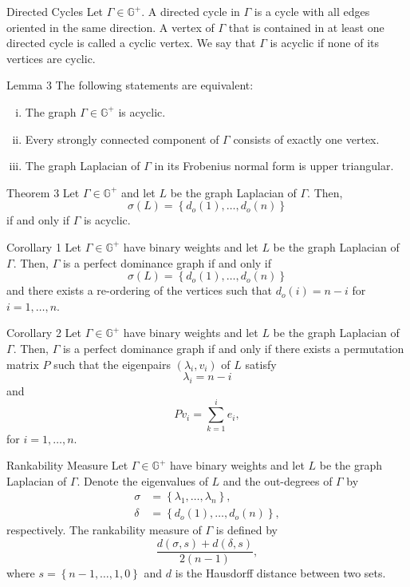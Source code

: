 \documentclass{beamer}
\begin{document}
\begin{frame}{Directed Cycles}
Let $\Gamma\in\mathbb{G}^{+}$. 
A directed cycle in $\Gamma$ is a cycle with all edges oriented in the same direction.
\vfill
A vertex of $\Gamma$ that is contained in at least one directed cycle is called a cyclic vertex.
\vfill
We say that $\Gamma$ is acyclic if none of its vertices are cyclic.
\end{frame}

\begin{frame}{Lemma 3}
The following statements are equivalent:
\vfill
\begin{enumerate}[i.]
\item	The graph $\Gamma\in\mathbb{G}^{+}$ is acyclic.
\vfill
\item	Every strongly connected component of $\Gamma$ consists of exactly one vertex.
\vfill
\item	The graph Laplacian of $\Gamma$ in its Frobenius normal form is upper triangular. 
\end{enumerate}
\end{frame}

\begin{frame}{Theorem 3}
Let $\Gamma\in\mathbb{G}^{+}$ and let $L$ be the graph Laplacian of $\Gamma$.
Then,
\[
\sigma(L)=\left\{d_{o}(1),\ldots,d_{o}(n)\right\}
\]
if and only if $\Gamma$ is acyclic. 
\end{frame}

\begin{frame}{Corollary 1}
Let $\Gamma\in\mathbb{G}^{+}$ have binary weights and let $L$ be the graph Laplacian of $\Gamma$.
\vfill
Then, $\Gamma$ is a perfect dominance graph if and only if
\[
\sigma(L)=\left\{d_{o}(1),\ldots,d_{o}(n)\right\}
\]
and there exists a re-ordering of the vertices such that $d_{o}(i)=n-i$ for $i=1,\ldots,n$.
\end{frame}

\begin{frame}{Corollary 2}
Let $\Gamma\in\mathbb{G}^{+}$ have binary weights and let $L$ be the graph Laplacian of $\Gamma$.
\vfill
Then, $\Gamma$ is a perfect dominance graph if and only if there exists a permutation matrix $P$ such that the eigenpairs $(\lambda_{i},v_{i})$ of $L$ satisfy
\[
\lambda_{i}=n-i
\]
and
\[
Pv_{i}=\sum_{k=1}^{i}e_{i},
\]
for $i=1,\ldots,n$.
\end{frame}

\begin{frame}{Rankability Measure}
Let $\Gamma\in\mathbb{G}^{+}$ have binary weights and let $L$ be the graph Laplacian of $\Gamma$.
\vfill
Denote the eigenvalues of $L$ and the out-degrees of $\Gamma$ by
\begin{align*}
\sigma &= \left\{\lambda_{1},\ldots,\lambda_{n}\right\}, \\
\delta &= \left\{d_{o}(1),\ldots,d_{o}(n)\right\},
\end{align*}
respectively.
\vfill
The rankability measure of $\Gamma$ is defined by
\[
\frac{d(\sigma,s)+d(\delta,s)}{2(n-1)},
\]
where $s=\left\{n-1,\ldots,1,0\right\}$ and $d$ is the Hausdorff distance between two sets.
\end{frame}
\end{document}
